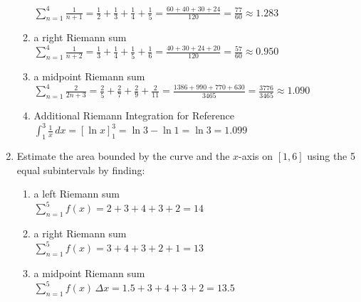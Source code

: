 \documentclass[10pt, letterpaper]{report}
\begin{document}
\begin{enumerate}
\begin{enumerate}
        $\sum_{n=1}^{4}\frac{1}{n+1}=
        \frac{1}{2}+\frac{1}{3}+\frac{1}{4}+\frac{1}{5}=
        \frac{60+40+30+24}{120}=
        \frac{77}{60}\approx1.283$ \\

      \item{a right Riemann sum} \\

        $\sum_{n=1}^{4}\frac{1}{n+2}=
        \frac{1}{3}+\frac{1}{4}+\frac{1}{5}+\frac{1}{6}=
        \frac{40+30+24+20}{120}=
        \frac{57}{60}\approx0.950$ \\

      \item{a midpoint Riemann sum} \\

        $\sum_{n=1}^4\frac{2}{2n+3}=
        \frac{2}{5}+\frac{2}{7}+\frac{2}{9}+\frac{2}{11}=
        \frac{1386+990+770+630}{3465}=
        \frac{3776}{3465}\approx1.090$ \\

      \item{Additional Riemann Integration for Reference} \\

        $\int_{1}^{3}\frac{1}{x}\,dx=
        [\ln{x}]_{1}^3=
        \ln{3}-\ln{1}=\ln{3}=1.099$ \\

    \end{enumerate}
\pagebreak
  \item{Estimate the area bounded by the curve and the $x$-axis on $[1,6]$ using the 5 equal subintervals by finding:}
    \begin{enumerate}
      \item{a left Riemann sum} \\

        $\sum_{n=1}^{5}f(x)=
        2+3+4+3+2=14$ \\

      \item{a right Riemann sum} \\

        $\sum_{n=1}^{5}f(x)=
        3+4+3+2+1=13$ \\

      \item{a midpoint Riemann sum} \\

        $\sum_{n=1}^{5}f(x)\,\Delta x=
        1.5+3+4+3+2=13.5$ \\


\end{enumerate}
\end{enumerate}
\end{document}
